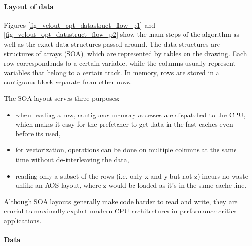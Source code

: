 \documentclass[12pt]{article}
\begin{document}
\paragraph{Layout of data} \mbox{}\vspace{0.4pc}

Figures \ref{fig_velout_opt_datastruct_flow_p1} and \ref{fig_velout_opt_datastruct_flow_p2} show the main steps of the algorithm as well as the exact data structures passed around. The data structures are structures of arrays (SOA), which are represented by tables on the drawing. Each row correspondonds to a certain variable, while the columns usually represent variables that belong to a certain track. In memory, rows are stored in a contiguous block separate from other rows.

The SOA layout serves three purposes:
\begin{itemize}
	\item when reading a row, contiguous memory accesses are dispatched to the CPU, which makes it easy for the prefetcher to get data in the fast caches even before its used,
	\item for vectorization, operations can be done on multiple columns at the same time without de-interleaving the data,
	\item reading only a subset of the rows (i.e. only x and y but not z) incurs no waste unlike an AOS layout, where z would be loaded as it's in the same cache line.
\end{itemize}

Although SOA layouts generally make code harder to read and write, they are crucial to maximally exploit modern CPU architectures in performance critical applications.

\paragraph{Data} \mbox{}\vspace{0.4pc}
\end{document}
